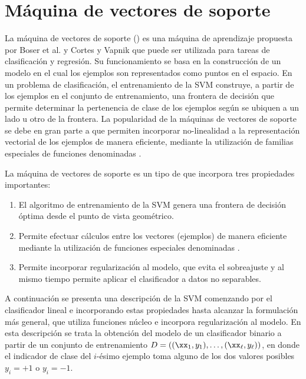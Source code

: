 %
%
%
\section{Máquina de vectores de soporte}
%
La máquina de vectores de soporte ()
es una máquina de aprendizaje propuesta por Boser et al. \cite{boser}
y Cortes y Vapnik \cite{svm} que puede ser utilizada para tareas de
clasificación y regresión.
Su funcionamiento se basa en la construcción de un modelo en el cual
los ejemplos son representados como puntos en el espacio.
En un problema de clasificación, el entrenamiento de la SVM construye,
a partir de los ejemplos en el conjunto de entrenamiento, una frontera
de decisión que permite determinar la pertenencia de clase de los
ejemplos según se ubiquen a un lado u otro de la frontera.
La popularidad de la máquinas de vectores de soporte se debe en gran
parte a que permiten incorporar no-linealidad a la representación
vectorial de los ejemplos de manera eficiente, mediante la utilización
de familias especiales de funciones denominadas .


La máquina de vectores de soporte es un tipo de  que incorpora tres propiedades importantes:
%
\begin{enumerate}
\item El algoritmo de entrenamiento de la SVM genera una frontera de
  decisión óptima desde el punto de vista geométrico.
\item Permite efectuar cálculos entre los vectores (ejemplos) de
  manera eficiente mediante la utilización de funciones especiales
  denominadas .
\item Permite incorporar regularización al modelo, que evita el
  sobreajuste y al mismo tiempo permite aplicar el clasificador a
  datos no separables.
\end{enumerate}
%
A continuación se presenta una descripción de la SVM comenzando por el
clasificador lineal e incorporando estas propiedades hasta alcanzar la
formulación más general, que utiliza funciones núcleo e incorpora
regularización al modelo.
En esta descripción se trata la obtención del modelo de un
clasificador binario a partir de un conjunto de entrenamiento
$D=\left((\xx_1,y_1),\ldots,(\xx_\ell,y_\ell)\right)$, en donde el
indicador de clase del $i$-ésimo ejemplo toma alguno de los dos
valores posibles $y_i=+1$ o $y_i=-1$.
